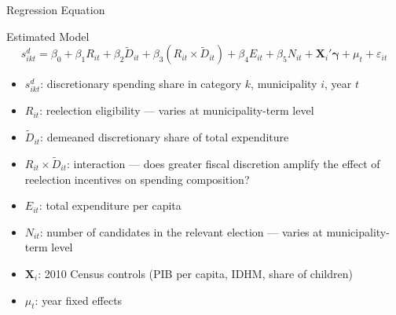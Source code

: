 \documentclass{beamer}
\begin{document}
\begin{frame}{Regression Equation}
\begin{block}{Estimated Model}
\begin{equation*}
    s^{d}_{ikt} = \beta_0
                + \beta_1 R_{it}
                + \beta_2 \tilde{D}_{it}
                + \beta_3 (R_{it} \times \tilde{D}_{it})
                + \beta_4 E_{it}
                + \beta_5 N_{it}
                + \mathbf{X}_i'\boldsymbol{\gamma}
                + \mu_t
                + \varepsilon_{it}
\end{equation*}
\end{block}
\vspace{0.3em}
\begin{itemize}
    \item $s^{d}_{ikt}$: discretionary spending share in category $k$, municipality $i$, year $t$
    \item $R_{it}$: reelection eligibility --- varies at municipality-term level
    \item $\tilde{D}_{it}$: demeaned discretionary share of total expenditure
    \item $R_{it} \times \tilde{D}_{it}$: interaction --- does greater fiscal discretion amplify the effect of reelection incentives on spending composition?
    \item $E_{it}$: total expenditure per capita
    \item $N_{it}$: number of candidates in the relevant election --- varies at municipality-term level
    \item $\mathbf{X}_i$: 2010 Census controls (PIB per capita, IDHM, share of children)
    \item $\mu_t$: year fixed effects
\end{itemize}
\end{frame}
\end{document}
